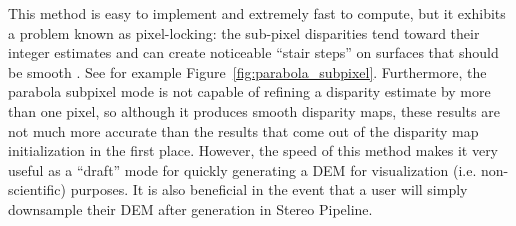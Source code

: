 This method is easy to implement and extremely fast to compute, but it
exhibits a problem known as pixel-locking: the sub-pixel disparities
tend toward their integer estimates and can create noticeable ``stair
steps'' on surfaces that should be smooth
\citep{Stein06:attenuating,Szeliski03sampling}.  See
for example Figure~\ref{fig:parabola_subpixel}. Furthermore, the parabola
subpixel mode is not capable of refining a disparity estimate by more
than one pixel, so although it produces smooth disparity maps, these
results are not much more accurate than the results that come out of
the disparity map initialization in the first place.  However, the
speed of this method makes it very useful as a ``draft'' mode for
quickly generating a \ac{DEM} for visualization (i.e. non-scientific)
purposes. It is also beneficial in the event that a user will simply
downsample their DEM after generation in Stereo Pipeline.

